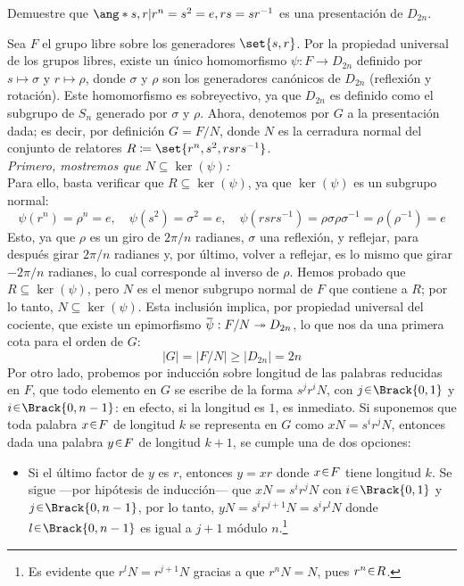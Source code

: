 \begin{ejer}
Demuestre que $\ang*{ s,r|r^{n}=s^{2}=e,rs=sr^{-1}}$ es una presentación de $D_{2n}$.
\end{ejer}
\begin{sol}[Demostración]
Sea $F$ el grupo libre sobre los generadores $\set{s, r}$. Por la propiedad universal de los grupos libres, existe un único homomorfismo $\psi: F \to D_{2n}$ definido por $s \mapsto \sigma$ y $r \mapsto \rho$, donde $\sigma$ y $\rho$ son los generadores canónicos de $D_{2n}$ (reflexión y rotación). Este homomorfismo es sobreyectivo, ya que $D_{2n}$ es definido como el subgrupo de $S_n$ generado por $\sigma$ y $\rho$.
Ahora, denotemos por $G$ a la presentación dada; es decir, por definición $G = F/N$, donde $N$ es la cerradura normal del conjunto de relatores $R \coloneq \set{r^n, s^2, rsrs^{-1}}$.
\\
\emph{Primero, mostremos que $N \subseteq \ker(\psi)$:}\\
Para ello, basta verificar que $R \subseteq \ker(\psi)$, ya que $\ker(\psi)$ es un subgrupo normal:
\[
\psi(r^n) = \rho^n = e, \quad \psi(s^2) = \sigma^2 = e, \quad \psi(rsrs^{-1}) = \rho\sigma\rho\sigma^{-1} = \rho(\rho^{-1}) = e
\]
Esto, ya que $\rho$ es un giro de $2\pi/n$ radianes, $\sigma$ una reflexión, y reflejar, para después girar $2\pi/n$ radianes y, por último, volver a reflejar, es lo mismo que girar $-2\pi/n$ radianes, lo cual corresponde al inverso de $\rho$. Hemos probado que $R \subseteq \ker(\psi)$, pero $N$ es el menor subgrupo normal de $F$ que contiene a $R$; por lo tanto, $N \subseteq \ker(\psi)$. Esta inclusión implica, por propiedad universal del cociente, que existe un epimorfismo $\ubar{\psi}: F/N \twoheadrightarrow D_{2n}$, lo que nos da una primera cota para el orden de $G$:
\[
|G| = |F/N| \ge |D_{2n}| = 2n
\]
Por otro lado, probemos por inducción sobre longitud de las palabras reducidas en $F$, que todo elemento en $G$ se escribe de la forma $s^j r^i N$, con $j \en \Brack{0,1}$ y $i \en \Brack{0,n-1}$: en efecto, si la longitud es $1$, es inmediato. Si suponemos que toda palabra $x \en F$ de longitud $k$ se representa en $G$ como $xN = s^ir^jN$, entonces dada una palabra $y \en F$ de longitud $k+1$, se cumple una de dos opciones:
\begin{itemize}
    \item Si el último factor de $y$ es $r$, entonces $y = xr$ donde $x \en F$ tiene longitud $k$. Se sigue ---por hipótesis de inducción--- que $xN = s^ir^jN$ con $i \en \Brack{0,1}$ y $j \en \Brack{0,n-1}$, por lo tanto, $yN = s^ir^{j+1}N = s^ir^lN$ donde $l \en \Brack{0,n-1}$ es igual a $j+1$ módulo $n$.\footnote{Es evidente que $r^lN = r^{j+1}N$ gracias a que $r^nN = N$, pues $r^n \en R$.}


\end{itemize}
\end{sol}
